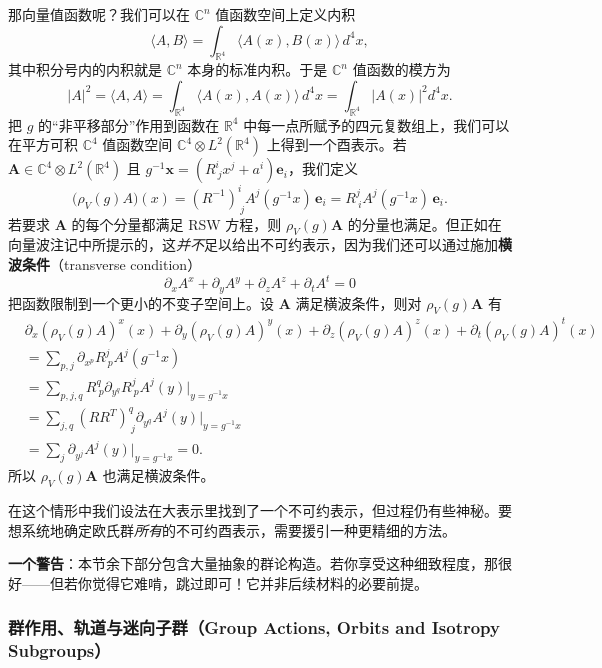 那向量值函数呢？我们可以在 $\mathbb{C}^n$ 值函数空间上定义内积
\[
\langle A,B\rangle=\int_{\mathbb{R}^4}\langle A(x),B(x)\rangle\,d^4x,
\]
其中积分号内的内积就是 $\mathbb{C}^n$ 本身的标准内积。于是 $\mathbb{C}^n$ 值函数的模方为
\[
|A|^2=\langle A,A\rangle=\int_{\mathbb{R}^4}\langle A(x),A(x)\rangle\,d^4x=\int_{\mathbb{R}^4}|A(x)|^2 d^4x .
\]
把 $g$ 的“非平移部分”作用到函数在 $\mathbb{R}^4$ 中每一点所赋予的四元复数组上，我们可以在平方可积 $\mathbb{C}^4$ 值函数空间 $\mathbb{C}^4\otimes L^2(\mathbb{R}^4)$ 上得到一个酉表示。若 $\mathbf{A}\in\mathbb{C}^4\otimes L^2(\mathbb{R}^4)$ 且 $g^{-1}\mathbf{x}=(R^i_{\ j}x^j+a^i)\mathbf{e}_i$，我们定义
\[
\big(\rho_V(g)A\big)(x)
=(R^{-1})^i_{\ j}A^j(g^{-1}x)\,\mathbf{e}_i
=R^j_{\ i}A^j(g^{-1}x)\,\mathbf{e}_i .
\]
若要求 $\mathbf{A}$ 的每个分量都满足 RSW 方程，则 $\rho_V(g)\mathbf{A}$ 的分量也满足。但正如在向量波注记中所提示的，这\emph{并不}足以给出不可约表示，因为我们还可以通过施加\textbf{横波条件}（transverse condition）
\begin{equation}
\partial_x A^x+\partial_y A^y+\partial_z A^z+\partial_t A^t=0 \tag{Transverse}
\end{equation}
把函数限制到一个更小的不变子空间上。设 $\mathbf{A}$ 满足横波条件，则对 $\rho_V(g)\mathbf{A}$ 有
\begin{align*}
&\partial_x(\rho_V(g)A)^x(x)+\partial_y(\rho_V(g)A)^y(x)
+\partial_z(\rho_V(g)A)^z(x)+\partial_t(\rho_V(g)A)^t(x)\\
&=\sum_{p,j}\partial_{x^p}R^j_{\ p}A^j(g^{-1}x)\\
&=\sum_{p,j,q}R^q_{\ p}\partial_{y^q}R^j_{\ p}A^j(y)\Big|_{y=g^{-1}x}\\
&=\sum_{j,q}(RR^T)^q_{\ j}\partial_{y^q}A^j(y)\Big|_{y=g^{-1}x}\\
&=\sum_{j}\partial_{y^j}A^j(y)\Big|_{y=g^{-1}x}=0 .
\end{align*}
所以 $\rho_V(g)\mathbf{A}$ 也满足横波条件。

在这个情形中我们设法在大表示里找到了一个不可约表示，但过程仍有些神秘。要想系统地确定欧氏群\emph{所有}的不可约酉表示，需要援引一种更精细的方法。

\textbf{一个警告}：本节余下部分包含大量抽象的群论构造。若你享受这种细致程度，那很好——但若你觉得它难啃，跳过即可！它并非后续材料的必要前提。

\subsubsection{群作用、轨道与迷向子群（Group Actions, Orbits and Isotropy Subgroups）}

